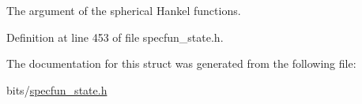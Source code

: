 The argument of the spherical Hankel functions. 



Definition at line 453 of file specfun\+\_\+state.\+h.



The documentation for this struct was generated from the following file\+:\begin{DoxyCompactItemize}
\item 
bits/\hyperlink{specfun__state_8h}{specfun\+\_\+state.\+h}\end{DoxyCompactItemize}
